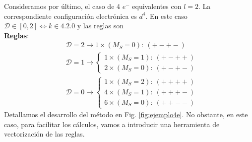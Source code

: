 Consideramos por último, el caso de 4 $e^-$ equivalentes con $l=2$. La correspondiente configuración electrónica es $d^{4}$. En este caso $\mathcal{D}\in [0,2] \iff k \in \qty{4,2,0}$ y las reglas son \\
\underline{\textbf{Reglas}}:
\begin{align}
  &\mathcal{D}=2 \longrightarrow 1\times (M_{S}=0):\ (+-+-)\\
  &\mathcal{D}=1 \longrightarrow \begin{cases}
    1\times (M_{S}=1):\ (+-++)\\
    2\times (M_{S}=0):\ (+-+-)
  \end{cases}\\
  &\mathcal{D}=0 \longrightarrow \begin{cases}
    1\times (M_{S}= 2):\ (++++)\\
    4\times (M_{S}=1):\ (+++-)\\
    6\times (M_{S}=0):\ (++--)
  \end{cases}
 \end{align}
Detallamos el desarrollo del método en Fig. \ref{fig:ejemplo4e}. No obstante, en este caso, para facilitar los cálculos, vamos a introducir una herramienta de vectorización de las reglas. 

